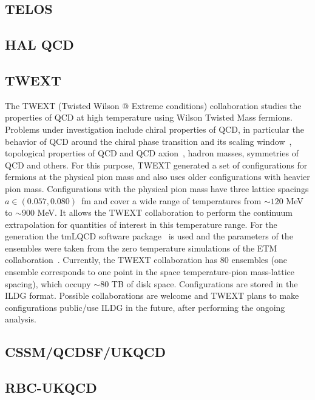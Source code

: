 \documentclass[a4paper,11pt]{article}
\begin{document}
\subsection{TELOS}

\subsection{HAL QCD}

\subsection{TWEXT}
\begin{linenumbers}[1]
The TWEXT (Twisted Wilson @ Extreme conditions) collaboration studies
the properties of QCD at high temperature using Wilson Twisted Mass
fermions. Problems under investigation include chiral properties of
QCD, in particular the behavior of QCD around the chiral phase
transition and its scaling window~\cite{Kotov:2021rah}, topological
properties of QCD and QCD axion~\cite{Kotov:2021ujj}, hadron masses,
symmetries of QCD and others. For this purpose, TWEXT generated a set
of configurations for  fermions at the physical pion mass
and also uses older configurations with heavier pion
mass. Configurations with the physical pion mass have three lattice
spacings $a\in(0.057,0.080)$~fm and cover a wide range of temperatures
from $\sim120$ MeV to $\sim900$ MeV. It allows the TWEXT collaboration
to perform the continuum extrapolation for quantities of interest in
this temperature range. For the generation the tmLQCD software
package~\cite{Jansen:2009xp,Deuzeman:2013xaa,Abdel-Rehim:2013wba} is
used and the parameters of the ensembles were taken from the zero
temperature simulations of the ETM
collaboration~\cite{Alexandrou:2018egz}. Currently, the TWEXT
collaboration has 80 ensembles (one ensemble corresponds to one point
in the space temperature-pion mass-lattice spacing), which occupy
$\sim80$ TB of disk space. Configurations are stored in the ILDG
format. Possible collaborations are welcome and TWEXT plans to make
configurations public/use ILDG in the future, after performing the
ongoing analysis.
\end{linenumbers}

\subsection{CSSM/QCDSF/UKQCD}

\subsection{RBC-UKQCD}
\end{document}
